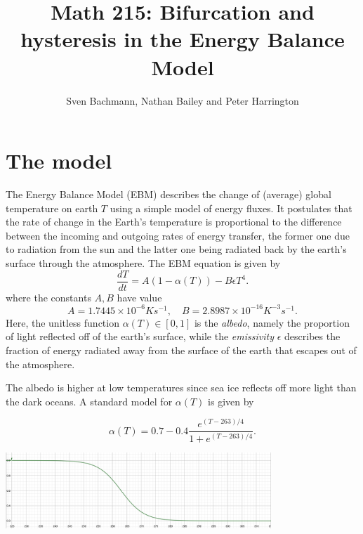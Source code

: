 \documentclass[10pt, letterpaper, answer]{exam}
\title{Math 215: Bifurcation and hysteresis in the Energy Balance Model}
\author{Sven Bachmann, Nathan Bailey and Peter Harrington}
\date{}
\begin{document}
\maketitle

\section{The model}

The Energy Balance Model (EBM) describes the change of (average) global temperature on earth $T$ using a simple model of energy fluxes. It postulates that the rate of change in the Earth's temperature is proportional to the difference between the incoming and outgoing rates of energy transfer, the former one due to radiation from the sun and the latter one being radiated back by the earth's surface through the atmosphere. The EBM equation is given by
\begin{equation}\label{EBM}
    \dfrac{dT}{dt} = A(1 - \alpha(T)) - B\epsilon T^4.
\end{equation}
where the constants $A,B$ have value
\begin{equation}
    A = 1.7445 \times 10^{-6} Ks^{-1},\quad
    B = 2.8987 \times 10^{-16} K^{-3}s^{-1}.
\end{equation}
Here, the unitless function $\alpha(T) \in [0,1]$ is the \emph{albedo}, namely the proportion of light reflected off of the earth's surface, while the \emph{emissivity}  $\epsilon$ describes the fraction of energy radiated away from the surface of the earth that escapes out of the atmosphere.

The albedo is higher at low temperatures since sea ice reflects off more light than the dark oceans. A standard model for $\alpha(T)$ is given by


\begin{equation}
   \alpha (T)=0.7-0.4\frac{e^{(T-263)/4}}{1+e^{(T-263)/4}}. 
\end{equation}

\begin{center}
   \includegraphics[width=0.75\textwidth]{Albedo.png} 
\end{center}

\bigskip
\end{document}
